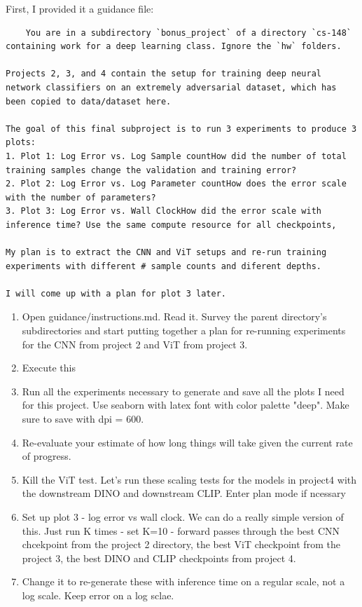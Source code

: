 \documentclass[11pt]{article}
\begin{document}
First, I provided it a guidance file:
\begin{verbatim}
    You are in a subdirectory `bonus_project` of a directory `cs-148` containing work for a deep learning class. Ignore the `hw` folders.

Projects 2, 3, and 4 contain the setup for training deep neural network classifiers on an extremely adversarial dataset, which has been copied to data/dataset here.

The goal of this final subproject is to run 3 experiments to produce 3 plots:
1. Plot 1: Log Error vs. Log Sample countHow did the number of total training samples change the validation and training error?
2. Plot 2: Log Error vs. Log Parameter countHow does the error scale with the number of parameters?
3. Plot 3: Log Error vs. Wall ClockHow did the error scale with inference time? Use the same compute resource for all checkpoints,

My plan is to extract the CNN and ViT setups and re-run training experiments with different # sample counts and diferent depths. 

I will come up with a plan for plot 3 later. 

\end{verbatim}

\begin{enumerate}
    \item Open guidance/instructions.md. Read it. Survey the parent directory's subdirectories and start putting together a plan 
  for re-running experiments for the CNN from project 2 and ViT from project 3.  
  \item Execute this
  \item Run all the experiments necessary to generate and save all the plots I need for this project. Use seaborn with latex  
  font with color palette "deep". Make sure to save with dpi = 600.      
  \item Re-evaluate your estimate of how long things will take given the current rate of progress.            
  \item Kill the ViT test. Let's run these scaling tests for the models in project4 with the downstream DINO and downstream    
  CLIP. Enter plan mode if ncessary      
  \item Set up plot 3 - log error vs wall clock. We can do a really simple version of this. Just run K times - set K=10 -      
  forward passes through the best CNN chcekpoint from the project 2 directory, the best ViT checkpoint from the project    
  3, the best DINO and CLIP checkpoints from project 4.      
  \item Change it to re-generate these with inference time on a regular scale, not a log scale. Keep error on a log sclae.    
\end{enumerate}
\end{document}
